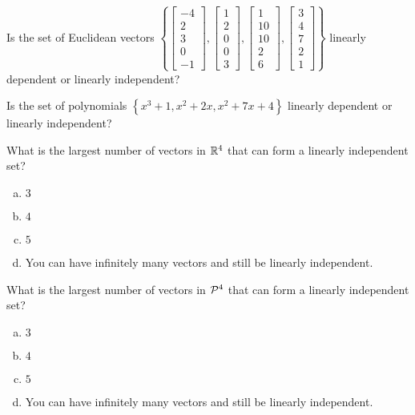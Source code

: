 \begin{applicationActivities}
\begin{activity}{5}
  Is the set of Euclidean vectors \(\left\{
  \begin{bmatrix}-4\\2\\3\\0\\-1\end{bmatrix},
  \begin{bmatrix}1\\2\\0\\0\\3\end{bmatrix},
  \begin{bmatrix}1\\10\\10\\2\\6\end{bmatrix},
  \begin{bmatrix}3\\4\\7\\2\\1\end{bmatrix}
  \right\}\) linearly dependent or linearly independent?
\end{activity}

\begin{activity}{10}
  Is the set of polynomials \(\left\{
  x^3+1,x^2+2x,x^2+7x+4
  \right\}\) linearly dependent or linearly independent?
\end{activity}

\begin{activity}{5}
What is the largest number of vectors in \(\IR^4\) that can form a linearly independent set?
\begin{enumerate}[(a)]
\item \(3\)
\item \(4\)
\item \(5\)
\item You can have infinitely many vectors and still be linearly independent.
\end{enumerate}
\end{activity}

\begin{activity}{5}
What is the largest number of vectors in \(\P^4\) that can form a linearly independent set?
\begin{enumerate}[(a)]
\item \(3\)
\item \(4\)
\item \(5\)
\item You can have infinitely many vectors and still be linearly independent.
\end{enumerate}
\end{activity}


\end{applicationActivities}
